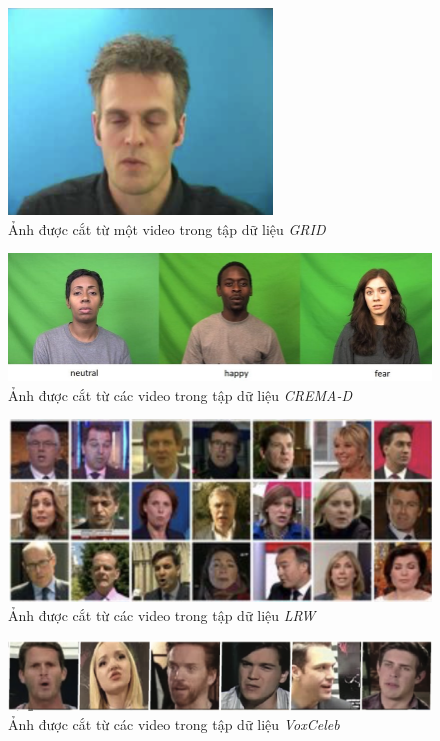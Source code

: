 \begin{figure}[H]
    \centering
    \includegraphics[width=7cm]{./content/images/grid_img.png}
    \caption{Ảnh được cắt từ một video trong tập dữ liệu \textit{GRID}}
    \label{fig:sample-rapv1}
\end{figure}

\begin{figure}[H]
    \centering
    \includegraphics[width=15cm]{./content/images/crema-d_img.jpg}
    \caption{Ảnh được cắt từ các video trong tập dữ liệu \textit{CREMA-D}}
    \label{fig:sample-rapv1}
\end{figure}

\begin{figure}[H]
    \centering
    \includegraphics[width=15cm]{./content/images/lrw_img.png}
    \caption{Ảnh được cắt từ các video trong tập dữ liệu \textit{LRW}}
    \label{fig:sample-rapv1}
\end{figure}

\begin{figure}[H]
    \centering
    \includegraphics[width=15cm]{./content/images/vox_img.png}
    \caption{Ảnh được cắt từ các video trong tập dữ liệu \textit{VoxCeleb}}
    \label{fig:sample-rapv1}
\end{figure}

